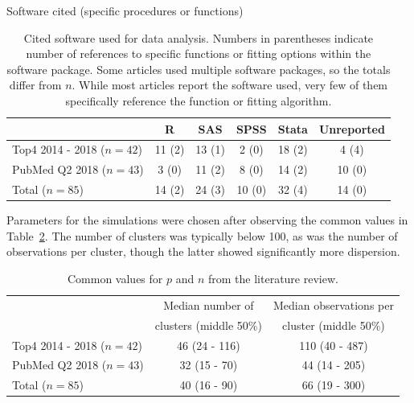 \documentclass{article}
\begin{document}
\begin{flushleft}
\begin{table}[]
\centering
Software cited (specific procedures or functions)
 \begin{tabular}{ |l||c|c|c|c|c| } 
 \hline
      & R & SAS & SPSS & Stata & Unreported\\ 
     \hline
    Top4 2014 - 2018 ($n=42$) & 11 (2) & 13 (1) & 2 (0) & 18 (2) & 4 (4)  \\ 
    PubMed Q2 2018 ($n=43$) & 3 (0) & 11 (2) & 8 (0) & 14 (2) & 10 (0) \\ 
    \hline
    Total ($n=85$) & 14 (2) & 24 (3) & 10 (0) & 32 (4) & 14 (0) \\ 
\hline
 \end{tabular}
    \caption{Cited software used for data analysis. Numbers in parentheses indicate number of references to specific functions or fitting options within the software package. Some articles used multiple software packages, so the totals differ from $n$. While most articles report the software used, very few of them specifically reference the function or fitting algorithm.}
    \label{tab:lit_review}
\end{table}

Parameters for the simulations were chosen after observing the common values in Table~\ref{tab:lit_review_numbers}. The number of clusters was typically below 100, as was the number of observations per cluster, though the latter showed significantly more dispersion.

\begin{table}[]
\centering
 \begin{tabular}{ |l||c|c| } 
 \hline
      & Median number of & Median observations per \\ 
      & clusters (middle 50\%) & cluster (middle 50\%) \\ 
     \hline
    Top4 2014 - 2018 ($n=42$) & 46 (24 - 116) & 110 (40 - 487) \\ 
    PubMed Q2 2018 ($n=43$) & 32 (15 - 70) & 44 (14 - 205) \\ 
    \hline
    Total ($n=85$) & 40 (16 - 90) & 66 (19 - 300) \\
    \hline
 \end{tabular}
    \caption{Common values for $p$ and $n$ from the literature review.}
    \label{tab:lit_review_numbers}
\end{table}




\end{flushleft}
\end{document}
